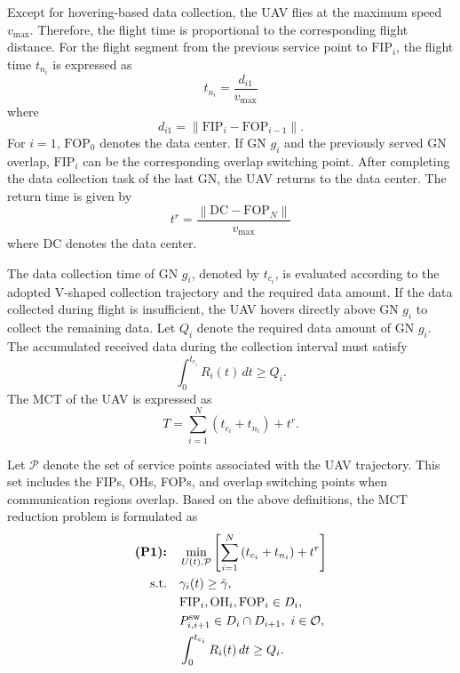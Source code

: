 \documentclass[12pt]{ksthesis}
\begin{document}
\begin{thesis}
{    Except for hovering-based data collection, the UAV flies at the maximum speed \(v_{\max}\). Therefore, the flight time is proportional to the corresponding flight distance. For the flight segment from the previous service point to \(\mathrm{FIP}_i\), the flight time \(t_{n_i}\) is expressed as
    \begin{equation}
        t_{n_i}=\frac{d_{i1}}{v_{\max}}
    \end{equation}
    where
    \begin{equation}
        d_{i1}=\left\|\mathrm{FIP}_i-\mathrm{FOP}_{i-1}\right\|.
    \end{equation}
    For \(i=1\), \(\mathrm{FOP}_0\) denotes the data center. If GN \(g_i\) and the previously served GN overlap, \(\mathrm{FIP}_i\) can be the corresponding overlap switching point. After completing the data collection task of the last GN, the UAV returns to the data center. The return time is given by
    \begin{equation}
        t^r=\frac{\left\|\mathrm{DC}-\mathrm{FOP}_N\right\|}{v_{\max}}
    \end{equation}
    where \(\mathrm{DC}\) denotes the data center.

    The data collection time of GN \(g_i\), denoted by \(t_{c_i}\), is evaluated according to the adopted V-shaped collection trajectory and the required data amount. If the data collected during flight is insufficient, the UAV hovers directly above GN \(g_i\) to collect the remaining data. Let \(Q_i\) denote the required data amount of GN \(g_i\). The accumulated received data during the collection interval must satisfy
    \begin{equation}
        \int_{0}^{t_{c_i}} R_i(t)\,dt \geq Q_i.
    \end{equation}
    The MCT of the UAV is expressed as
    \begin{equation}
        T=\sum_{i=1}^{N}\left(t_{c_i}+t_{n_i}\right)+t^r.
    \end{equation}

    Let \(\mathcal{P}\) denote the set of service points associated with the UAV trajectory. This set includes the FIPs, OHs, FOPs, and overlap switching points when communication regions overlap. Based on the above definitions, the MCT reduction problem is formulated as
    \begin{subequations}
    \label{eq:p1}
    \begin{align}
    \textbf{(P1):}\quad 
    &\min_{U(t),\mathcal{P}}
    \left[
    \sum_{i=1}^{N}\left(t_{c_i}+t_{n_i}\right)+t^r
    \right] \notag \\
    \text{s.t.}\quad 
    &\gamma_i(t)\geq \bar{\gamma}, 
    \label{eq:p1_snr}\\
    &\mathrm{FIP}_i,\mathrm{OH}_i,\mathrm{FOP}_i \in D_i,
    \label{eq:p1_points}\\
    &P^{\mathrm{sw}}_{i,i+1} \in D_i \cap D_{i+1},\ i\in \mathcal{O},
    \label{eq:p1_overlap}\\
    &\int_{0}^{t_{c_i}} R_i(t)\,dt \geq Q_i.
    \label{eq:p1_data}
    \end{align}
    \end{subequations}

}
\end{thesis}
\end{document}

